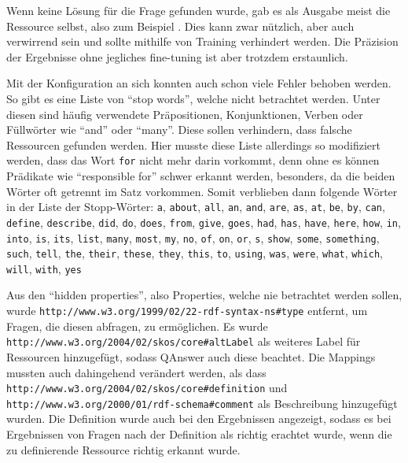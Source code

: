Wenn keine Lösung für die Frage gefunden wurde, gab es als Ausgabe meist die Ressource selbst, also zum Beispiel .
Dies kann zwar nützlich, aber auch verwirrend sein und sollte mithilfe von Training verhindert werden.
Die Präzision der Ergebnisse ohne jegliches fine-tuning ist aber trotzdem erstaunlich.

Mit der Konfiguration an sich konnten auch schon viele Fehler behoben werden.
So gibt es eine Liste von \enquote{stop words}, welche nicht betrachtet werden.
Unter diesen sind häufig verwendete Präpositionen, Konjunktionen, Verben oder Füllwörter wie \enquote{and} oder \enquote{many}.
Diese sollen verhindern, dass falsche Ressourcen gefunden werden.
Hier musste diese Liste allerdings so modifiziert werden, dass das Wort \texttt{for} nicht mehr darin vorkommt, denn ohne es können Prädikate wie \enquote{responsible for} schwer erkannt werden,
besonders, da die beiden Wörter oft getrennt im Satz vorkommen.
Somit verblieben dann folgende Wörter in der Liste der Stopp-Wörter:
\texttt{a}, \texttt{about}, \texttt{all}, \texttt{an}, \texttt{and}, \texttt{are}, \texttt{as}, \texttt{at}, \texttt{be}, \texttt{by}, \texttt{can}, \texttt{define}, \texttt{describe}, \texttt{did}, \texttt{do}, \texttt{does}, \texttt{from}, \texttt{give}, \texttt{goes}, \texttt{had}, \texttt{has}, \texttt{have}, \texttt{here}, \texttt{how}, \texttt{in}, \texttt{into}, \texttt{is}, \texttt{its}, \texttt{list}, \texttt{many}, \texttt{most}, \texttt{my}, \texttt{no}, \texttt{of}, \texttt{on}, \texttt{or}, \texttt{s}, \texttt{show}, \texttt{some}, \texttt{something}, \texttt{such}, \texttt{tell}, \texttt{the}, \texttt{their}, \texttt{these}, \texttt{they}, \texttt{this}, \texttt{to}, \texttt{using}, \texttt{was}, \texttt{were}, \texttt{what}, \texttt{which}, \texttt{will}, \texttt{with}, \texttt{yes}

Aus den \enquote{hidden properties}, also Properties, welche nie betrachtet werden sollen, wurde \texttt{http://www.w3.org/1999/02/22-rdf-syntax-ns\#type} entfernt,
um Fragen, die diesen abfragen, zu ermöglichen.
Es wurde \texttt{http://www.w3.org/2004/02/skos/core\#altLabel} als weiteres Label für Ressourcen hinzugefügt, sodass QAnswer auch diese beachtet.
Die Mappings mussten auch dahingehend verändert werden, als dass \texttt{http://www.w3.org/2004/02/skos/core\#definition}
und \texttt{http://www.w3.org/2000/01/rdf-schema\#comment} als Beschreibung hinzugefügt wurden.
Die Definition wurde auch bei den Ergebnissen angezeigt, sodass es bei Ergebnissen von Fragen nach der Definition als richtig erachtet wurde, wenn die zu definierende Ressource richtig erkannt wurde.

